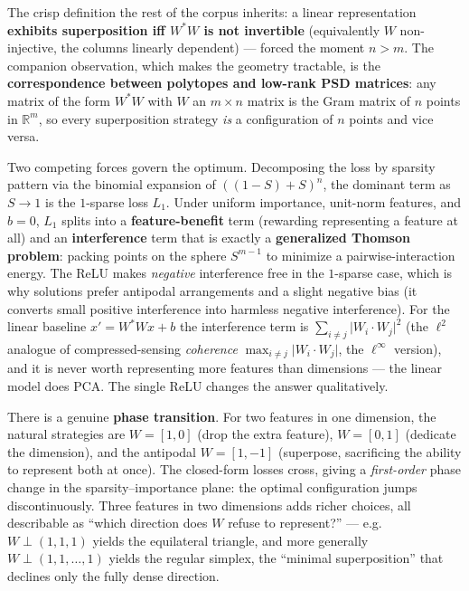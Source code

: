The crisp definition the rest of the corpus inherits: a linear representation \textbf{exhibits superposition iff $W^{*}W$ is not invertible} (equivalently $W$ non-injective, the columns linearly dependent) --- forced the moment $n > m$. The companion observation, which makes the geometry tractable, is the \textbf{correspondence between polytopes and low-rank PSD matrices}: any matrix of the form $W^{*}W$ with $W$ an $m\times n$ matrix is the Gram matrix of $n$ points in $\mathbb{R}^m$, so every superposition strategy \emph{is} a configuration of $n$ points and vice versa.

Two competing forces govern the optimum. Decomposing the loss by sparsity pattern via the binomial expansion of $((1-S)+S)^n$, the dominant term as $S\to 1$ is the $1$-sparse loss $L_1$. Under uniform importance, unit-norm features, and $b=0$, $L_1$ splits into a \textbf{feature-benefit} term (rewarding representing a feature at all) and an \textbf{interference} term that is exactly a \textbf{generalized Thomson problem}: packing points on the sphere $S^{m-1}$ to minimize a pairwise-interaction energy. The ReLU makes \emph{negative} interference free in the $1$-sparse case, which is why solutions prefer antipodal arrangements and a slight negative bias (it converts small positive interference into harmless negative interference). For the linear baseline $x' = W^{*}Wx+b$ the interference term is $\sum_{i\ne j}\lvert W_i\cdot W_j\rvert^2$ (the $\ell^2$ analogue of compressed-sensing \emph{coherence} $\max_{i\ne j}\lvert W_i\cdot W_j\rvert$, the $\ell^\infty$ version), and it is never worth representing more features than dimensions --- the linear model does PCA. The single ReLU changes the answer qualitatively.

There is a genuine \textbf{phase transition}. For two features in one dimension, the natural strategies are $W=[1,0]$ (drop the extra feature), $W=[0,1]$ (dedicate the dimension), and the antipodal $W=[1,-1]$ (superpose, sacrificing the ability to represent both at once). The closed-form losses cross, giving a \emph{first-order} phase change in the sparsity--importance plane: the optimal configuration jumps discontinuously. Three features in two dimensions adds richer choices, all describable as ``which direction does $W$ refuse to represent?'' --- e.g. $W \perp (1,1,1)$ yields the equilateral triangle, and more generally $W \perp (1,1,\dots,1)$ yields the regular simplex, the ``minimal superposition'' that declines only the fully dense direction.


